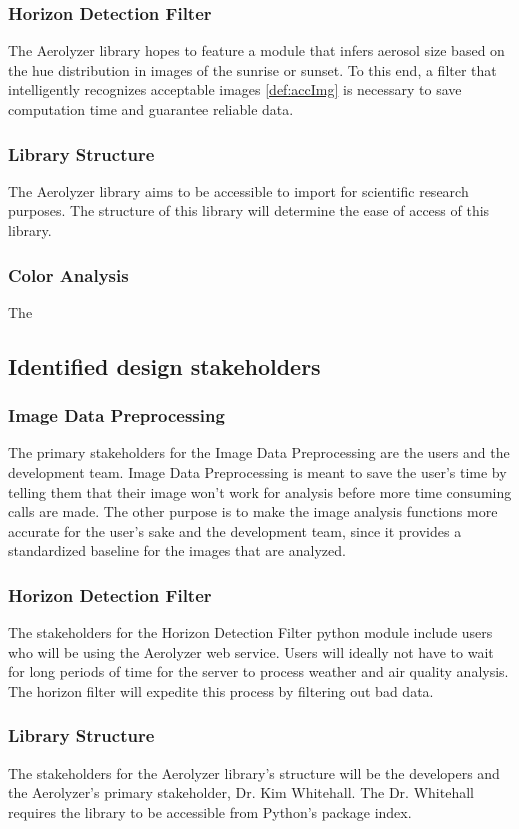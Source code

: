 \documentclass[onecolumn, draftclsnofoot,10pt, compsoc]{IEEEtran}
\begin{document}
\begin{singlespace}
        \subsubsection{Horizon Detection Filter}
        The Aerolyzer library hopes to feature a module that infers aerosol size based on the hue distribution in images of the sunrise or sunset. To this end, a filter that intelligently recognizes acceptable images \ref{def:accImg} is necessary to save computation time and guarantee reliable data.
        \subsubsection{Library Structure}
        The Aerolyzer library aims to be accessible to import for scientific research purposes. The structure of this library will determine the ease of access of this library.
		\subsubsection{Color Analysis}
        The 
	\subsection{Identified design stakeholders}
    	\subsubsection{Image Data Preprocessing}
        The primary stakeholders for the Image Data Preprocessing are the users and the development team.
		Image Data Preprocessing is meant to save the user's time by telling them that their image won't work for analysis before more time consuming calls are made.
		The other purpose is to make the image analysis functions more accurate for the user's sake and the development team, since it provides a standardized baseline for the images that are analyzed.
        \subsubsection{Horizon Detection Filter}
        The stakeholders for the Horizon Detection Filter python module include users who will be using the Aerolyzer web service. Users will ideally not have to wait for long periods of time for the server to process weather and air quality analysis. The horizon filter will expedite this process by filtering out bad data.
        \subsubsection{Library Structure}
        The stakeholders for the Aerolyzer library’s structure will be the developers and the Aerolyzer’s primary stakeholder, Dr. Kim Whitehall. The Dr. Whitehall requires the library to be accessible from Python’s package index.

\end{singlespace}
\end{document}
